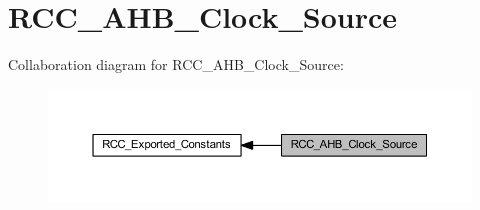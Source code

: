 \hypertarget{group___r_c_c___a_h_b___clock___source}{}\section{R\+C\+C\+\_\+\+A\+H\+B\+\_\+\+Clock\+\_\+\+Source}
\label{group___r_c_c___a_h_b___clock___source}
Collaboration diagram for R\+C\+C\+\_\+\+A\+H\+B\+\_\+\+Clock\+\_\+\+Source\+:
\nopagebreak
\begin{figure}[H]
\begin{center}
\leavevmode
\includegraphics[width=350pt]{group___r_c_c___a_h_b___clock___source}
\end{center}
\end{figure}
